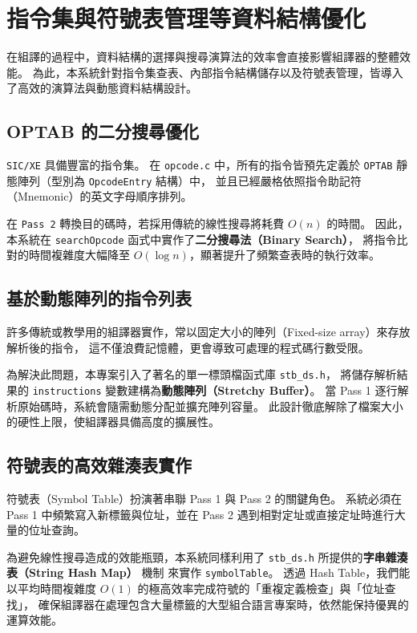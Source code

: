 \section{指令集與符號表管理等資料結構優化}

在組譯的過程中，資料結構的選擇與搜尋演算法的效率會直接影響組譯器的整體效能。
為此，本系統針對指令集查表、內部指令結構儲存以及符號表管理，皆導入了高效的演算法與動態資料結構設計。

\subsection{OPTAB 的二分搜尋優化}

\lstinline{SIC/XE} 具備豐富的指令集。
在 \lstinline{opcode.c} 中，所有的指令皆預先定義於 \lstinline{OPTAB} 靜態陣列（型別為 \lstinline{OpcodeEntry} 結構）中，
並且已經嚴格依照指令助記符（Mnemonic）的英文字母順序排列。

在 \lstinline{Pass 2} 轉換目的碼時，若採用傳統的線性搜尋將耗費 $O(n)$ 的時間。
因此，本系統在 \lstinline{searchOpcode} 函式中實作了\textbf{二分搜尋法（Binary Search）}，
將指令比對的時間複雜度大幅降至 $O(\log n)$，顯著提升了頻繁查表時的執行效率。

\subsection{基於動態陣列的指令列表}

許多傳統或教學用的組譯器實作，常以固定大小的陣列（Fixed-size array）來存放解析後的指令，
這不僅浪費記憶體，更會導致可處理的程式碼行數受限。

為解決此問題，本專案引入了著名的單一標頭檔函式庫 \lstinline{stb_ds.h}，
將儲存解析結果的 \lstinline{instructions} 變數建構為\textbf{動態陣列（Stretchy Buffer）}。
當 Pass 1 逐行解析原始碼時，系統會隨需動態分配並擴充陣列容量。
此設計徹底解除了檔案大小的硬性上限，使組譯器具備高度的擴展性。

\subsection{符號表的高效雜湊表實作}

符號表（Symbol Table）扮演著串聯 Pass 1 與 Pass 2 的關鍵角色。
系統必須在 Pass 1 中頻繁寫入新標籤與位址，並在 Pass 2 遇到相對定址或直接定址時進行大量的位址查詢。

為避免線性搜尋造成的效能瓶頸，本系統同樣利用了 \lstinline{stb_ds.h} 所提供的\textbf{字串雜湊表（String Hash Map）} 機制
來實作 \lstinline{symbolTable}。
透過 Hash Table，我們能以平均時間複雜度 $O(1)$ 的極高效率完成符號的「重複定義檢查」與「位址查找」，
確保組譯器在處理包含大量標籤的大型組合語言專案時，依然能保持優異的運算效能。
